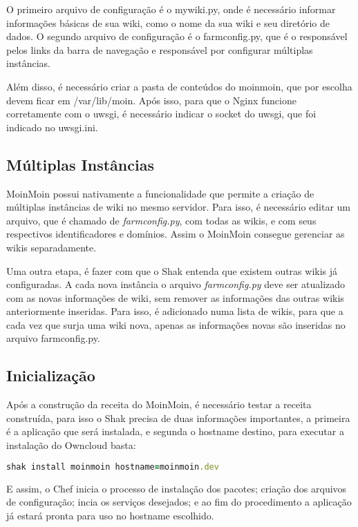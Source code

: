 O primeiro arquivo de configuração é o mywiki.py, onde é necessário
informar informações básicas de sua wiki, como o nome da sua wiki e seu diretório de dados. 
O segundo arquivo de configuração é o farmconfig.py, que é o responsável pelos 
links da barra de navegação e responsável por configurar múltiplas instâncias.

Além disso, é necessário criar a pasta de conteúdos do moinmoin, que por
escolha devem ficar em /var/lib/moin. Após isso, para que o Nginx funcione corretamente
com o uwsgi, é necessário indicar o socket do uwsgi, que foi indicado no uwsgi.ini.

\subsection{Múltiplas Instâncias}

MoinMoin possui nativamente a funcionalidade que permite a criação de múltiplas 
instâncias de wiki no mesmo servidor. Para isso, é necessário editar um arquivo,
que é chamado de \textit{farmconfig.py}, com todas as wikis, e com seus 
respectivos identificadores e domínios. Assim o MoinMoin consegue gerenciar as 
wikis separadamente. 

Uma outra etapa, é fazer com que o Shak entenda que existem outras wikis já 
configuradas. A cada nova instância
o arquivo \textit{farmconfig.py} deve ser atualizado com as novas 
informações de wiki, sem remover as
informações das outras wikis anteriormente inseridas. Para isso, é adicionado
numa lista de wikis, para que a cada vez que surja uma wiki nova, apenas as
informações novas são inseridas no arquivo farmconfig.py.

\subsection{Inicialização}

Após a construção da receita do MoinMoin, é necessário testar a receita construída,
para isso o Shak precisa de duas informações importantes, a primeira é a aplicação
que será instalada, e segunda o hostname destino, para executar a instalação
do Owncloud basta:

\begin{lstlisting}[language=Ruby,label=dice_index,caption={Exemplo de execução de instalação do owncloud com shak}]
shak install moinmoin hostname=moinmoin.dev
\end{lstlisting}

E assim, o Chef inicia o processo de instalação dos pacotes; criação dos arquivos
de configuração; incia os serviços desejados; e ao fim do procedimento a aplicação
já estará pronta para uso no hostname escolhido.

